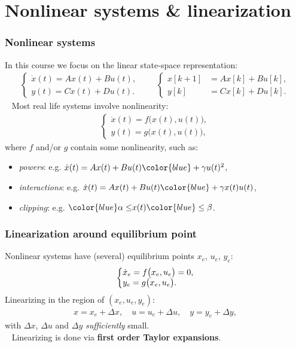 \section{Nonlinear systems \& linearization}
\begin{frame}
	\frametitle{Nonlinear systems}
	In this course we focus on the linear state-space representation:
	\begin{align*}
	\left\{ \begin{matrix} 
	\dot{x}(t) = A x(t) + B u(t), \\ 
	y(t) = C x(t) + D u(t).
	\end{matrix}\right.\quad\quad
	\left\{ \begin{matrix} 
	x[k+1] &= A x[k] + B u[k], \\ 
	y[k] &= C x[k] + D u[k].
	\end{matrix}\right.
	\end{align*}
	\pause
	\ \newline
	Most real life systems involve nonlinearity:
	\begin{align*}
	\left\{ \begin{matrix} 
	\dot{x}(t) = f\big(x(t), u(t)\big), \\ 
	y(t) = g\big(x(t), u(t)\big),
	\end{matrix}\right.
	\end{align*}
	where $f$ and/or $g$ contain some nonlinearity, such as:
	\begin{itemize}
		\item \emph{powers}: e.g. $\dot{x}(t) = A x(t) + B u(t) {\color{blue}+ \gamma u(t)^2}$,
		\item \emph{interactions}: e.g. $\dot{x}(t) = A x(t) + B u(t) {\color{blue}+ \gamma x(t) u(t)}$,
		\item \emph{clipping}: e.g. ${\color{blue}\alpha \leq }x(t){\color{blue}\leq \beta}$.
	\end{itemize}
\end{frame}

\begin{frame}
	\frametitle{Linearization around equilibrium point}
	Nonlinear systems have (several) equilibrium points $x_e$, $u_e$, $y_e$:
	\begin{align*}
	\left\{ \begin{matrix}
	\dot{x}_e = f\big(x_e, u_e\big)=0, \hfill \\
	y_e = g\big(x_e, u_e\big). \hfill
	\end{matrix}\right.
	\end{align*}
	\pause
	Linearizing in the region of $(x_e, u_e, y_e)$:
	\begin{align*}
	x = x_e + \Delta x, \quad u = u_e + \Delta u, \quad y = y_e + \Delta y,
	\end{align*}
	with $\Delta x$, $\Delta u$ and $\Delta y$ \emph{sufficiently} small.\\
	\ \newline
	\pause
	Linearizing is done via \textbf{first order Taylor expansions}.
\end{frame}

